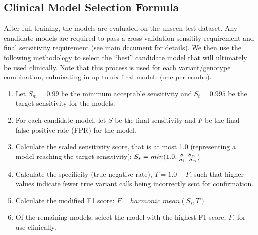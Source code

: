 \subsection{Clinical Model Selection Formula}
After full training, the models are evaluated on the unseen test dataset. Any candidate models are required to pass a cross-validation sensitity requirement and final sensitivity requirement (see main document for details). We then use the following methodology to select the ``best'' candidate model that will ultimately be used clinically.  Note that this process is used for each variant/genotype combination, culminating in up to six final models (one per combo).

\begin{enumerate}
    \item Let $S_m=0.99$ be the minimum acceptable sensitivity and $S_t=0.995$ be the target sensitivity for the models.
    \item For each candidate model, let $S$ be the final sensitivity and $F$ be the final false positive rate (FPR) for the model.
    \item Calculate the scaled sensitivity score, that is at most 1.0 (representing a model reaching the target sensitivity): $S_s = min(1.0, {S - S_m \over S_t - S_m})$
    \item Calculate the specificity (true negative rate), $T = 1.0-F$, such that higher values indicate fewer true variant calls being incorrectly sent for confirmation.
    \item Calculate the modified F1 score: $F = harmonic\_mean(S_s, T)$
    \item Of the remaining models, select the model with the highest F1 score, $F$, for use clinically.
\end{enumerate}
